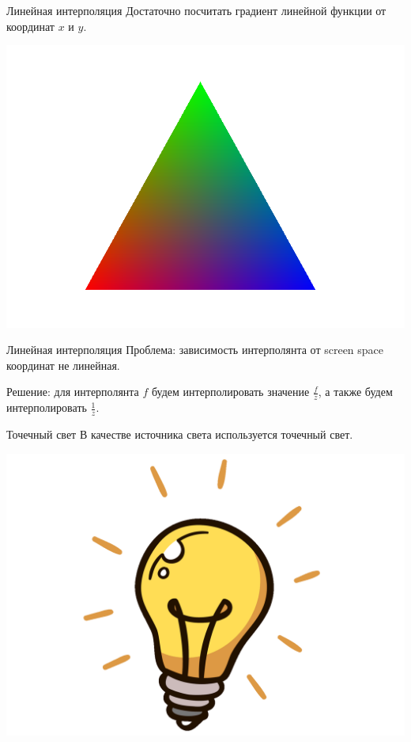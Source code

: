 \documentclass{beamer}
\begin{document}
\begin{frame}{Линейная интерполяция}
    Достаточно посчитать градиент линейной функции от координат 
    $x$ и $y$.
\begin{center}
\includegraphics[width=0.8 \linewidth]{gradient.png}
\end{center}
\end{frame}
\begin{frame}{Линейная интерполяция}
    Проблема: зависимость интерполянта от screen space координат 
    не линейная. 

    Решение: для интерполянта $f$ будем интерполировать значение
    $\frac{f}{z}$, а также будем интерполировать $\frac{1}{z}$.

\end{frame}

\begin{frame}{Точечный свет}
В качестве источника света используется точечный свет.
\begin{center}
\includegraphics[width=0.8 \linewidth]{lamp.png}
\end{center}
\end{frame}
\end{document}
